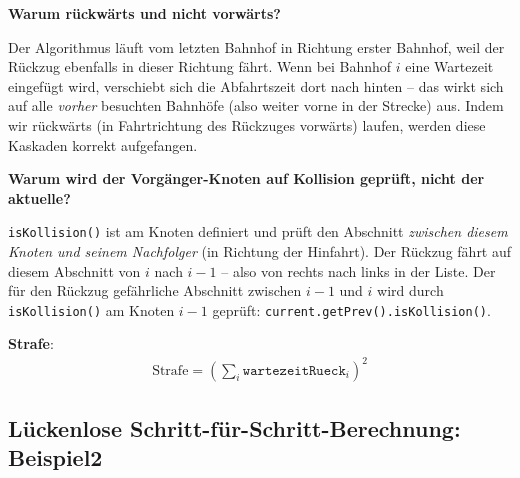 \documentclass[12pt,a4paper]{article}
\begin{document}
\textbf{Warum rückwärts und nicht vorwärts?}

Der Algorithmus läuft vom letzten Bahnhof in Richtung erster Bahnhof, weil der Rückzug ebenfalls in dieser Richtung fährt. Wenn bei Bahnhof $i$ eine Wartezeit eingefügt wird, verschiebt sich die Abfahrtszeit dort nach hinten -- das wirkt sich auf alle \emph{vorher} besuchten Bahnhöfe (also weiter vorne in der Strecke) aus. Indem wir rückwärts (in Fahrtrichtung des Rückzuges vorwärts) laufen, werden diese Kaskaden korrekt aufgefangen.

\textbf{Warum wird der Vorgänger-Knoten auf Kollision geprüft, nicht der aktuelle?}

\texttt{isKollision()} ist am Knoten definiert und prüft den Abschnitt \emph{zwischen diesem Knoten und seinem Nachfolger} (in Richtung der Hinfahrt). Der Rückzug fährt auf diesem Abschnitt von $i$ nach $i-1$ -- also von rechts nach links in der Liste. Der für den Rückzug gefährliche Abschnitt zwischen $i-1$ und $i$ wird durch \texttt{isKollision()} am Knoten $i-1$ geprüft: \texttt{current.getPrev().isKollision()}.

\textbf{Strafe}:
\begin{align*}
    \text{Strafe} = \left(\sum_i \texttt{wartezeitRueck}_i\right)^2
\end{align*}

\subsection{Lückenlose Schritt-für-Schritt-Berechnung: Beispiel2}
\end{document}
